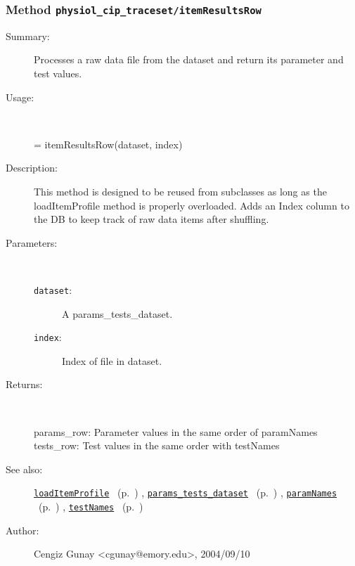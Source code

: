 \subsubsection[Method \texttt{itemResultsRow}]{Method \texttt{physiol\_cip\_traceset/itemResultsRow}}%
%
\label{ref_physiol_cip_traceset__itemResultsRow}%
\hypertarget{ref_physiol_cip_traceset__itemResultsRow}{}%
\begin{description}
\item[Summary:]Processes a raw data file from the dataset and return
		its parameter and test values.
%
\item[Usage:]~%
\begin{lyxcode}%
[params\_row, tests\_row] = itemResultsRow(dataset, index)
%
\end{lyxcode}%
%
\item[Description:]%
This method is designed to be reused from subclasses as long as the
 loadItemProfile method is properly overloaded. Adds an Index
 column to the DB to keep track of raw data items after shuffling.
\item[Parameters:]~
\begin{description}%
\item[\texttt{dataset}:]
 A params\_tests\_dataset.
\item[\texttt{index}:]
 Index of file in dataset.
\end{description}%
%
\item[Returns:]~

	params\_row: Parameter values in the same order of paramNames
	tests\_row: Test values in the same order with testNames
%
%
\item[See also:]%
\hyperlink{ref_loadItemProfile}{\texttt{loadItemProfile}}%
\ (p.~\pageref{ref_loadItemProfile})%
%
, \hyperlink{ref_params_tests_dataset}{\texttt{params\_tests\_dataset}}%
\ (p.~\pageref{ref_params_tests_dataset})%
%
, \hyperlink{ref_paramNames}{\texttt{paramNames}}%
\ (p.~\pageref{ref_paramNames})%
%
, \hyperlink{ref_testNames}{\texttt{testNames}}%
\ (p.~\pageref{ref_testNames})%
%
%
\item[Author:]%
Cengiz Gunay <cgunay@emory.edu>, 2004/09/10%
\end{description}
\methodline%
